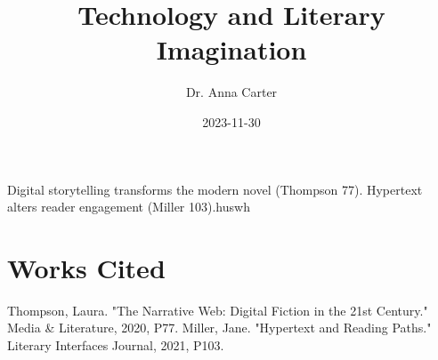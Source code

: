\documentclass{article}
\title{Technology and Literary Imagination}
\author{Dr. Anna Carter}
\date{2023-11-30}
\begin{document}
\maketitle
Digital storytelling transforms the modern novel (Thompson 77). Hypertext alters reader engagement (Miller 103).huswh

\section{Works Cited}
Thompson, Laura. "The Narrative Web: Digital Fiction in the 21st Century." Media \& Literature, 2020, P77.
Miller, Jane. "Hypertext and Reading Paths." Literary Interfaces Journal, 2021, P103.
\end{document}

